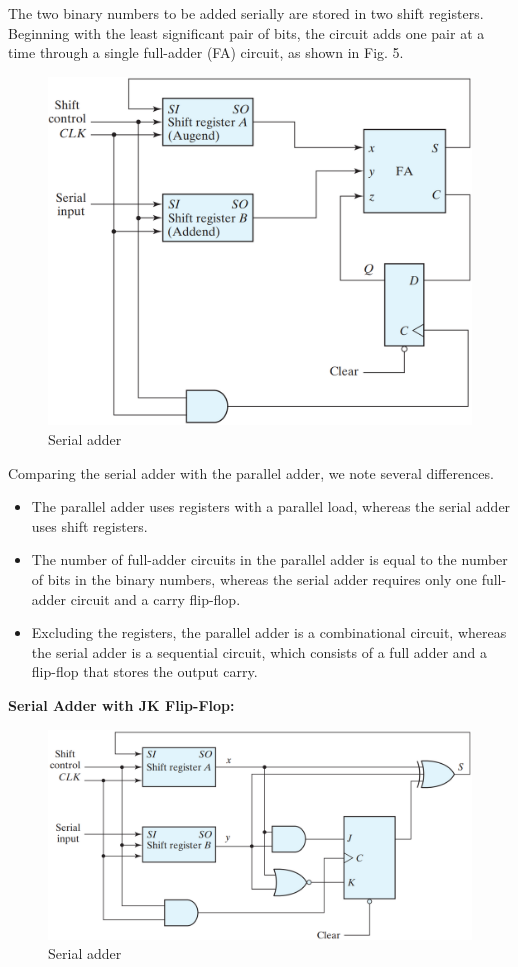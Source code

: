 The two binary numbers to be added serially are stored in two shift registers. Beginning with the least significant pair of bits, the circuit adds one pair at a time through a single full-adder (FA) circuit, as shown in Fig. 5.
\begin{figure}[H]
  \centering
  \includegraphics[width=\linewidth]{img/fig-6.5.png}
  \caption{Serial adder}
  \label{fig:6.5}
\end{figure}
Comparing the serial adder with the parallel adder, we note several differences.
\begin{itemize}
  \item The parallel adder uses registers with a parallel load, whereas the serial adder uses shift registers.
  \item The number of full-adder circuits in the parallel adder is equal to the number of bits in the binary numbers, whereas the serial adder requires only one full-adder circuit and a carry flip-flop.
  \item Excluding the registers, the parallel adder is a combinational circuit, whereas the serial adder is a sequential circuit, which consists of a full adder and a flip-flop that stores the output carry.
\end{itemize}

\noindent \textbf{Serial Adder with JK Flip-Flop:}
\begin{figure}[H]
  \centering
  \includegraphics[width=\linewidth]{img/fig-6.6.png}
  \caption{Serial adder}
  \label{fig:6.6}
\end{figure}

